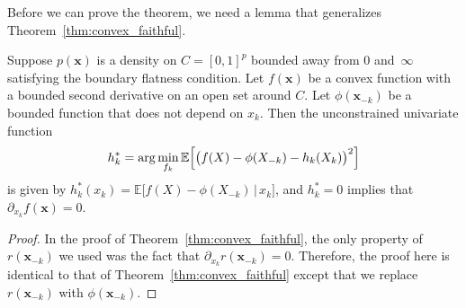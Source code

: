 Before we can prove the theorem, we need a lemma that generalizes Theorem~\ref{thm:convex_faithful}.

\begin{lemma}
\label{cor:faithfulness_extension}
Suppose $p(\mathbf{x})$ is a density on $C=[0,1]^p$ bounded away from
$0$ and~$\infty$ satisfying the boundary flatness condition.  Let
$f(\mathbf{x})$ be a convex function with a bounded second derivative
on an open set around $C$. Let $\phi(\mathbf{x}_{-k})$ be a bounded
function that does not depend on $x_k$. Then the
unconstrained univariate function
 \begin{align}
h^*_k = \arg\min_{f_k} \mathbb{E} \Bigl[\bigl( f(X) 
           - \phi(X_{-k}) - h_k(X_k) \bigr)^2\Bigr]
\end{align}
is given by $h^*_k(x_k) = \mathbb{E}\bigl[ f(X) - \phi(X_{-k}) \,|\, x_k\bigr]$,
and $ h^*_k = 0$ implies that $\partial_{x_k} f(\mathbf{x}) = 0$.
\end{lemma}

\begin{proof}
  In the proof of Theorem~\ref{thm:convex_faithful}, the only property
  of $r(\mathbf{x}_{-k})$ we used was the fact that $\partial_{x_k}
  r(\mathbf{x}_{-k}) = 0$. Therefore, the proof here is identical to
  that of Theorem~\ref{thm:convex_faithful} except that we replace $r(\mathbf{x}_{-k})$ with $\phi(\mathbf{x}_{-k})$.
\end{proof}


